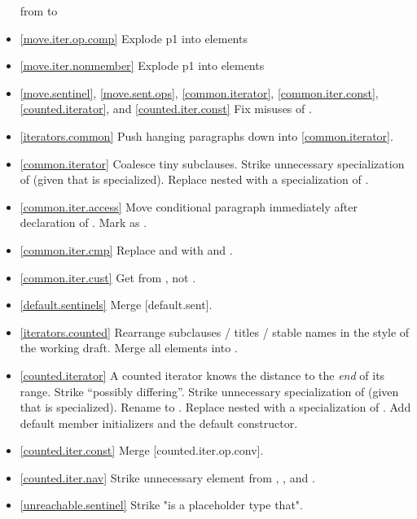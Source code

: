 \begin{itemize}
   from  to 
\item \ref{move.iter.op.comp} Explode p1 into \constraints elements
\item \ref{move.iter.nonmember} Explode p1 into \constraints elements
\item \ref{move.sentinel}, \ref{move.sent.ops}, \ref{common.iterator},
  \ref{common.iter.const}, \ref{counted.iterator},
  and \ref{counted.iter.const} Fix misuses of .
\item \ref{iterators.common} Push hanging paragraphs down
  into \ref{common.iterator}.
\item \ref{common.iterator} Coalesce tiny subclauses. Strike unnecessary
  specialization of  (given that 
  is specialized). Replace nested  with a specialization
  of .
\item \ref{common.iter.access} Move conditional  paragraph
  immediately after declaration of .
  Mark  as .
\item \ref{common.iter.cmp} Replace  and  with
   and .
\item \ref{common.iter.cust} Get  from , not .
\item \ref{default.sentinels} Merge [default.sent].
\item \ref{iterators.counted} Rearrange subclauses / titles / stable names
  in the style of the working draft. Merge all \returns elements into \effects.
\item \ref{counted.iterator} A counted iterator knows the distance to the
  \textit{end} of its range. Strike ``possibly differing''.
  Strike unnecessary specialization of 
  (given that  is specialized).
  Rename  to . Replace nested 
  with a specialization of .
  Add default member initializers and  the default constructor.
\item \ref{counted.iter.const} Merge [counted.iter.op.conv].
\item \ref{counted.iter.nav} Strike unnecessary \expects element from
  , , and
  .
\item \ref{unreachable.sentinel} Strike "is a placeholder type that".

\end{itemize}
